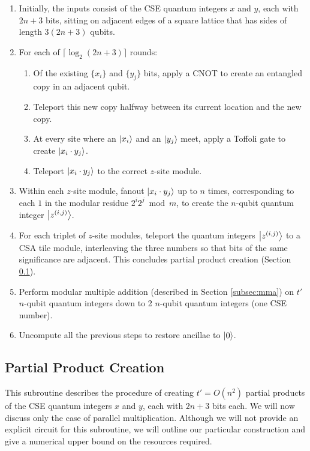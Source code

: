 \documentclass[twoside]{article}
\begin{document}
\begin{enumerate}
\item Initially, the inputs consist of the CSE quantum integers $x$ and $y$,
each with $2n+3$ bits, sitting on adjacent edges of a square lattice that has
sides of length $3(2n+3)$ qubits.
\item For each of $\lceil \log_2 (2n+3) \rceil$ rounds:
\begin{enumerate}
\item Of the existing $\{x_i\}$ and $\{y_j\}$ bits, apply a CNOT to create an
entangled copy in an adjacent qubit.
\item Teleport this new copy halfway between its current location and the
new copy.
\item At every site where an $\left\vert{x_i}\right\rangle$ and an $\left\vert{y_j}\right\rangle$ meet,
apply a Toffoli gate to create $\left\vert{x_i \cdot y_j}\right\rangle$.
\item Teleport $\left\vert{x_i \cdot y_j}\right\rangle$ to the correct $z$-site module.
\end{enumerate}
\item Within each $z$-site module, fanout $\left\vert{x_i \cdot y_j}\right\rangle$ up to $n$
times, corresponding to each $1$ in the modular residue $2^i 2^j \bmod m$,
to create the $n$-qubit quantum integer $\left\vert{z^{(i,j)}}\right\rangle$.
\item For each triplet of $z$-site modules, teleport the quantum integers
$\left\vert{z^{(i,j)}}\right\rangle$ to a CSA tile module, interleaving the three numbers so that
bits of the same significance are adjacent. This concludes partial product
creation (Section \ref{subsec:ppc}).
\item Perform modular multiple addition (described in Section \ref{subsec:mma})
on $t'$ $n$-qubit quantum integers down to 2 $n$-qubit quantum integers (one CSE number).
\item Uncompute all the previous steps to restore ancillae to $\left\vert{0}\right\rangle$.
\end{enumerate}
\subsection{Partial Product Creation}
\label{subsec:ppc}

This subroutine describes the procedure of creating $t'=O(n^2)$ partial products of
the CSE quantum integers $x$ and $y$, each with $2n+3$ bits each. We will now
discuss only the case of parallel multiplication. Although we
will not provide an explicit circuit for this subroutine, we will outline
our particular construction and give a numerical upper bound on the
resources required.
\end{document}
